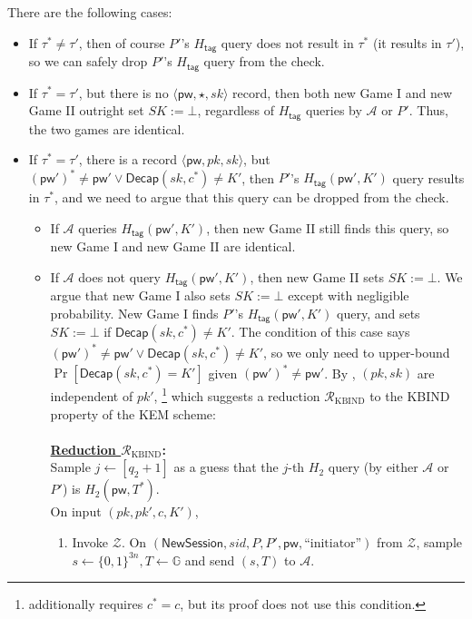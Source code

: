 \documentclass{article}
\theoremstyle{plain}
\theoremstyle{definition}
\theoremstyle{remark}
\newcommand{\group}{\mathbb{G}}
\newcommand{\adv}{\mathcal{A}}
\newcommand{\env}{\mathcal{Z}}
\newcommand{\red}{\mathcal{R}}
\newcommand{\Decap}{\mathsf{Decap}}
\newcommand{\Htag}{H_\mathsf{tag}}
\newcommand{\pw}{\mathsf{pw}}
\newcommand{\NewSession}{\mathsf{NewSession}}
\begin{document}
There are the following cases:
\begin{itemize}
  \item If $\tau^* \neq \tau'$, then of course $P'$'s $\Htag$ query does not result in $\tau^*$ (it results in $\tau'$), so we can safely drop $P'$'s $\Htag$ query from the check.
  \item If $\tau^* = \tau'$, but there is no $\langle\pw,\star,sk\rangle$ record, then both new Game I and new Game II outright set $SK := \bot$, regardless of $\Htag$ queries by $\adv$ or $P'$. Thus, the two games are identical.
  \item If $\tau^* = \tau'$, there is a record $\langle\pw,pk,sk\rangle$, but $(\pw')^* \neq \pw' \lor \Decap(sk,c^*) \neq K'$, then $P'$'s $\Htag(\pw',K')$ query results in $\tau^*$, and we need to argue that this query can be dropped from the check. 
      \begin{itemize}
        \item If $\adv$ queries $\Htag(\pw',K')$, then new Game II still finds this query, so new Game I and new Game II are identical.
        \item If $\adv$ does not query $\Htag(\pw',K')$, then new Game II sets $SK := \bot$. We argue that new Game I also sets $SK := \bot$ except with negligible probability. New Game I finds $P'$'s $\Htag(\pw',K')$ query, and sets $SK := \bot$ if $\Decap(sk,c^*) \neq K'$. The condition of this case says $(\pw')^* \neq \pw' \lor \Decap(sk,c^*) \neq K'$, so we only need to upper-bound $\Pr[\Decap(sk,c^*) = K']$ given $(\pw')^* \neq \pw'$. By , $(pk,sk)$ are independent of $pk'$, \footnote{ additionally requires $c^* = c$, but its proof does not use this condition.} which suggests a reduction $\red_\text{KBIND}$ to the KBIND property of the KEM scheme: \\
            \vspace{-6pt} \\ %
            \textbf{\underline{Reduction $\red_\mathrm{KBIND}$}:}
            \vspace{6pt} \\
            Sample $j \gets [q_2+1]$ as a guess that the $j$-th $H_2$ query (by either $\adv$ or $P'$) is $H_2(\pw,T^*)$. \\
            On input $(pk,pk',c,K')$,
            \begin{enumerate}
              \item Invoke $\env$. On $(\NewSession, sid, P, P', \pw, \text{``initiator''})$ from $\env$, sample $s \gets \{0,1\}^{3n}, T \gets \group$ and send $(s,T)$ to $\adv$. \\

\end{enumerate}
\end{itemize}
\end{itemize}
\end{document}
